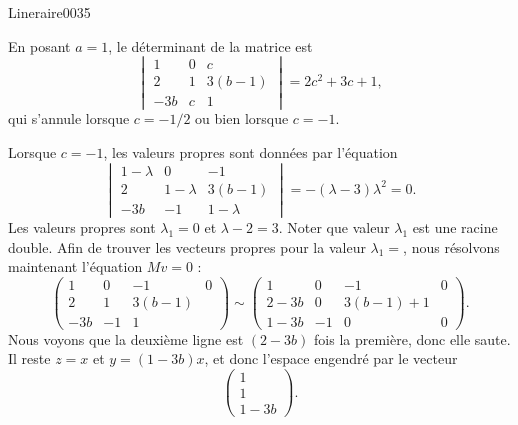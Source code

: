 \begin{corrige}{Lineraire0035}

	En posant $a=1$, le déterminant de la matrice est
	\begin{equation}
		\begin{vmatrix}
			1	&	0	&	c	\\
			2	&	1	&	3(b-1)	\\
			-3b	&	c	&	1
		\end{vmatrix}=2c^2+3c+1,
	\end{equation}
	qui s'annule lorsque $c=-1/2$ ou bien lorsque $c=-1$.

	Lorsque $c=-1$, les valeurs propres sont données par l'équation
	\begin{equation}
		\begin{vmatrix}
			1-\lambda	&	0	&	-1	\\
			2	&	1-\lambda	&	3(b-1)	\\
			-3b	&	-1	&	1-\lambda
		\end{vmatrix}=-(\lambda-3)\lambda^2=0.
	\end{equation}
	Les valeurs propres sont $\lambda_1=0$ et $\lambda-2=3$. Noter que valeur $\lambda_1$ est une racine double. Afin de trouver les vecteurs propres pour la valeur $\lambda_1=$, nous résolvons maintenant l'équation $Mv=0$ :
	\begin{equation}
		\left(\begin{array}{ccc|c}
			 1	&	0	&	-1	&	0	\\
			  2	&	1	&	3(b-1)	&	\\
			   -3b	&	-1	&	1	&		 
		   \end{array}\right)\sim
		   \left(\begin{array}{ccc|c}
			    1	&	0	&	-1	&	0	\\
			     2-3b	&	0	&	3(b-1)+1	&	\\
			      1-3b	&	-1	&	0	&	0	 
		      \end{array}\right).
	\end{equation}
	Nous voyons que la deuxième ligne est $(2-3b)$ fois la première, donc elle saute. Il reste $z=x$ et $y=(1-3b)x$, et donc l'espace engendré par le vecteur
	\begin{equation}
		\begin{pmatrix}
			1	\\ 
			1	\\ 
			1-3b	
		\end{pmatrix}.

\end{equation}
\end{corrige}
